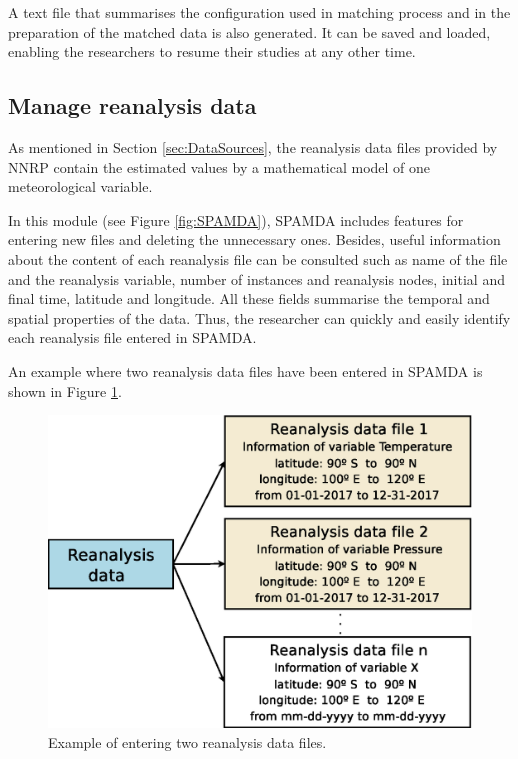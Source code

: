 \documentclass[energies,article,submit,moreauthors,pdftex]{Definitions/mdpi}
\begin{document}
				A text file that summarises the configuration used in matching process and in the preparation of the matched data is also generated. It can be saved and loaded, enabling the researchers to resume their studies at any other time.
				
				
			\subsection{Manage reanalysis data}
				
				As mentioned in Section \ref{sec:DataSources}, the reanalysis data files provided by NNRP contain the estimated values by a mathematical model of one meteorological variable.
				
				In this module (see Figure \ref{fig:SPAMDA}), SPAMDA includes features for entering new files and deleting the unnecessary ones. Besides, useful information about the content of each reanalysis file can be consulted such as name of the file and the reanalysis variable, number of instances and reanalysis nodes, initial and final time, latitude and longitude. All these fields summarise the temporal and spatial properties of the data. Thus, the researcher can quickly and easily identify each reanalysis file entered in SPAMDA.
				
				An example where two reanalysis data files have been entered in SPAMDA is shown in Figure \ref{fig:manageReanalisys}.
				
				\begin{figure}[H]
					\centering
					\includegraphics[scale=0.45]{figures/FigureManageReanalisys.eps}
					\caption{Example of entering two reanalysis data files.}
					\label{fig:manageReanalisys}
				\end{figure}
				
\end{document}
